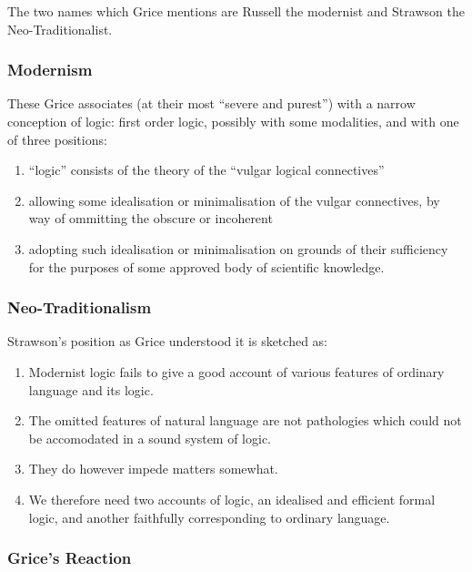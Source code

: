 \documentclass[10pt,titlepage]{book}
\begin{document}
The two names which Grice mentions are Russell the modernist and Strawson the Neo-Traditionalist.


\subsubsection{Modernism}

These Grice associates (at their most ``severe and purest'') with a narrow conception of logic: first order logic, possibly with some modalities, and with one of three positions:

\begin{enumerate}
\item ``logic'' consists of the theory of the ``vulgar logical connectives''

\item allowing some idealisation or minimalisation of the vulgar connectives, by way of ommitting the obscure or incoherent

\item adopting such idealisation or minimalisation on grounds of their sufficiency for the purposes of some approved body of scientific knowledge.
\end{enumerate}

\subsubsection{Neo-Traditionalism}

Strawson's position as Grice understood it is sketched as:

\begin{enumerate}

\item Modernist logic fails to give a good account of various features of ordinary language and its logic.

\item The omitted features of natural language are not pathologies which could not be accomodated in a sound system of logic.

\item They do however impede matters somewhat.

\item We therefore need two accounts of logic, an idealised and efficient formal logic, and another faithfully corresponding to ordinary language. 

\end{enumerate}

\subsubsection{Grice's Reaction}
\end{document}
